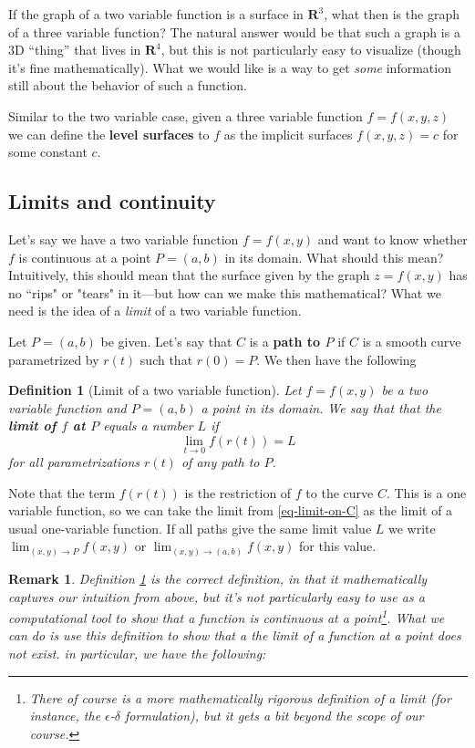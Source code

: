 \documentclass[12pt]{article}
\numberwithin{equation}{subsection}
\numberwithin{figure}{subsection}
\newtheorem{defn}[subsection]{Definition}
\theoremstyle{note}
\newtheorem{remark}[subsection]{Remark}
\begin{document}
{If the graph of a two variable function is a surface in $\mathbf{R}^3$, what then is the graph of a three variable function? The natural answer would be that such a graph is a 3D ``thing'' that lives in $\mathbf{R}^4$, but this is not particularly easy to visualize (though it's fine mathematically). What we would like is a way to get \textit{some} information still about the behavior of such a function. 

Similar to the two variable case, given a three variable function $f=f(x,y,z)$ we can define the \textbf{level surfaces} to $f$ as the implicit surfaces $f(x,y,z)=c$ for some constant $c$. 

\subsection{Limits and continuity} 
Let's say we have a two variable function $f=f(x,y)$ and want to know whether $f$ is continuous at a point $P=(a,b)$ in its domain. What should this mean? Intuitively, this should mean that the surface given by the graph $z=f(x,y)$ has no ``rips" or "tears" in it---but how can we make this mathematical? What we need is the idea of a \textit{limit} of a two variable function. 

Let $P=(a,b)$ be given. Let's say that $C$ is a \textbf{path to $P$} if $C$ is a smooth curve parametrized by $r(t)$ such that $r(0)=P$. We then have the following

\begin{defn}[Limit of a two variable function] \label{def-limit}
	Let $f=f(x,y)$ be a two variable function and $P=(a,b)$ a point in its domain. We say that that the \textbf{limit of $f$ at $P$} equals a number $L$ if \begin{equation} \label{eq-limit-on-C} \lim_{t\to 0} f(r(t))=L\end{equation}for all parametrizations $r(t)$  of any path to $P$.
\end{defn}
Note that the term $f(r(t))$ is the restriction of $f$ to the curve $C$. This is a one variable function, so we can take the limit from \eqref{eq-limit-on-C} as the limit of a usual one-variable function. If all paths give the same limit value $L$ we write $\displaystyle \lim_{(x,y)\to P} f(x,y)$ or $\displaystyle \lim_{(x,y)\to (a,b)} f(x,y)$   for this value. 

\begin{remark}
	Definition \ref{def-limit} is the \textit{correct} definition, in that it mathematically captures our intuition from above, but it's not particularly easy to \textit{use} as a computational tool to show that a function is continuous at a point\footnote{There of course is a more mathematically rigorous definition of a limit (for instance, the $\epsilon$-$\delta$ formulation), but it gets a bit beyond the scope of our course.}. What we can do is  use this definition to show that a the limit of a function at a point does \textit{not} exist. in particular, we have the following:


\end{remark}}
\end{document}
